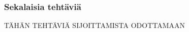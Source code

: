 \begin{tehtavasivu}
\subsubsection*{Sekalaisia tehtäviä}

TÄHÄN TEHTÄVIÄ SIJOITTAMISTA ODOTTAMAAN

\end{tehtavasivu}
